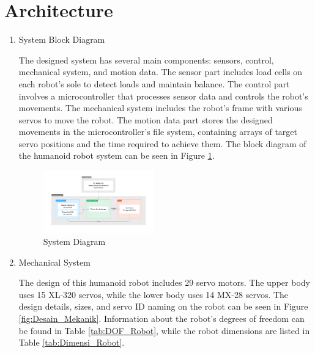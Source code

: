 \section{Architecture}
\label{sec:architecture}

\begin{enumerate}[label=\Alph*.]
    \item System Block Diagram
    \label{subsec:systemblockdiagram}

    \hspace*{1em} The designed system has several main components: sensors, control, mechanical system, and motion data. The sensor part includes load cells on each robot's sole to detect loads and maintain balance. The control part involves a microcontroller that processes sensor data and controls the robot's movements. The mechanical system includes the robot's frame with various servos to move the robot. The motion data part stores the designed movements in the microcontroller's file system, containing arrays of target servo positions and the time required to achieve them. The block diagram of the humanoid robot system can be seen in Figure \ref{fig:Diagram_Sistem}.

    \begin{figure} [h] \centering
        \includegraphics[width=0.45\textwidth]{gambar/Diagram_Sistem.png}
        \caption{System Diagram}
        \label{fig:Diagram_Sistem}
    \end{figure}

    \item Mechanical System
    \label{subsec:mechanicalsystem}

    \hspace*{1em} The design of this humanoid robot includes 29 servo motors. The upper body uses 15 XL-320 servos, while the lower body uses 14 MX-28 servos. The design details, sizes, and servo ID naming on the robot can be seen in Figure \ref{fig:Desain_Mekanik}. Information about the robot's degrees of freedom can be found in Table \ref{tab:DOF_Robot}, while the robot dimensions are listed in Table \ref{tab:Dimensi_Robot}.


\end{enumerate}
